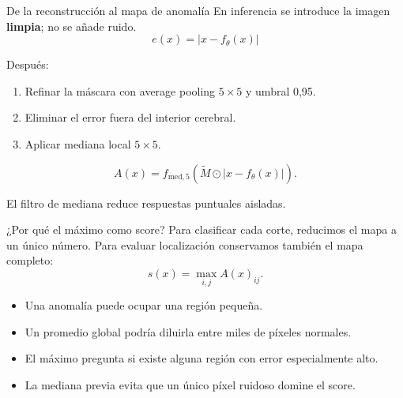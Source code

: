 \documentclass[10pt,aspectratio=169]{beamer}
\begin{document}
\begin{frame}{De la reconstrucción al mapa de anomalía}
  En inferencia se introduce la imagen \textbf{limpia}; no se añade ruido.
  \[
    e(x)=|x-f_\theta(x)|
  \]

  Después:
  \begin{enumerate}
    \item Refinar la máscara con average pooling $5\times5$ y umbral 0,95.
    \item Eliminar el error fuera del interior cerebral.
    \item Aplicar mediana local $5\times5$.
  \end{enumerate}

  \[
    A(x)=f_{\mathrm{med},5}\left(
      \widetilde M\odot|x-f_\theta(x)|
    \right).
  \]

  El filtro de mediana reduce respuestas puntuales aisladas.
\end{frame}

\begin{frame}{¿Por qué el máximo como score?}
  Para clasificar cada corte, reducimos el mapa a un único número.
  Para evaluar localización conservamos también el mapa completo:
  \[
    s(x)=\max_{i,j}A(x)_{ij}.
  \]

  \begin{itemize}
    \item Una anomalía puede ocupar una región pequeña.
    \item Un promedio global podría diluirla entre miles de píxeles normales.
    \item El máximo pregunta si existe alguna región con error especialmente alto.
    \item La mediana previa evita que un único píxel ruidoso domine el score.
  \end{itemize}
\end{frame}
\end{document}
